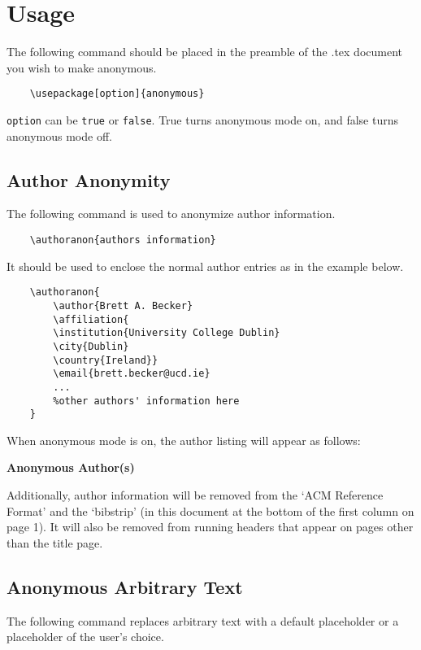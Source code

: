 \documentclass[sigconf, balance=false]{acmart}
\begin{document}
\section{Usage}
\label{sec:usage}

The following command should be placed in the preamble of the .tex document you wish to make anonymous. 
\begin{verbatim}
    \usepackage[option]{anonymous} 
\end{verbatim}

\noindent \texttt{option} can be \texttt{true} or \texttt{false}. True turns anonymous mode on, and false turns anonymous mode off. 

\subsection{Author Anonymity}
\label{sec:authors}
The following command is used to anonymize author information. 

\begin{verbatim}
    \authoranon{authors information}
\end{verbatim}

\noindent It should be used to enclose the normal author entries as in the example below. 

\begin{verbatim}
    \authoranon{
        \author{Brett A. Becker}
        \affiliation{
        \institution{University College Dublin}
        \city{Dublin}
        \country{Ireland}}
        \email{brett.becker@ucd.ie}
        ...
        %other authors' information here
    }
\end{verbatim}

\noindent When anonymous mode is on, the author listing will appear as follows:

\begin{center}
    \textbf{Anonymous Author(s)}
\end{center}
\vspace*{3mm}
\noindent Additionally, author information will be removed from the `ACM Reference Format' and the `bibstrip' (in this document at the bottom of the first column on page 1). It will also be removed from running headers that appear on pages other than the title page. 

\subsection{Anonymous Arbitrary Text}
\label{sec:text}
The following command replaces arbitrary text with a default placeholder or a placeholder of the user's choice.
\end{document}
